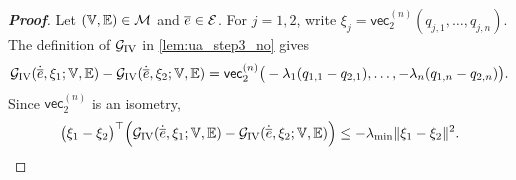 \begin{proof}[\bf Proof]
Let $(\mathbb{V},\mathbb{E})\in{\mathcal{M}}$ and $\overline e\in{\mathcal{E}}$. For $j=1,2$, write $\xi_j=\mathsf{vec}_2^{(n)}(q_{j,1},\dots,q_{j,n})$. The definition of ${\mathcal{G}}_{\mathrm{IV}}$ in \cref{lem:ua_step3_no} gives
\begin{equation*}
{\mathcal{G}}_{\mathrm{IV}}(\dot{\overline e},\xi_1;\mathbb{V},\mathbb{E})-{\mathcal{G}}_{\mathrm{IV}}(\dot{\overline e},\xi_2;\mathbb{V},\mathbb{E})
=\mathsf{vec}_2^{(n)}\big(-\lambda_1(q_{1,1}-q_{2,1}),\dots,-\lambda_n(q_{1,n}-q_{2,n})\big).
\end{equation*}
Since $\mathsf{vec}_2^{(n)}$ is an isometry,
\begin{equation}\label{eq:G_IV_dissipative}
\big(\xi_1-\xi_2\big)^{\top}\Big({\mathcal{G}}_{\mathrm{IV}}(\dot{\overline e},\xi_1;\mathbb{V},\mathbb{E})-{\mathcal{G}}_{\mathrm{IV}}(\dot{\overline e},\xi_2;\mathbb{V},\mathbb{E})\Big)
\le -\lambda_{\min}\|\xi_1-\xi_2\|^2.
\end{equation}


\end{proof}

